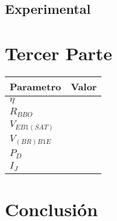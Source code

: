 \subsection{Experimental}

\section{Tercer Parte}
\begin{center}
  \begin{tabular}{l|c}
    Parametro &Valor \\ 
    \hline
    $\eta$          &  \\
    $R_{BBO}$       &  \\
    $V_{EB1(SAT)}$  &  \\
    $V_{(BR)B1E}$   &  \\
    $P_D$           &  \\
    $I_J$           &  
 \end{tabular} 
\end{center}

\section{Conclusión}

